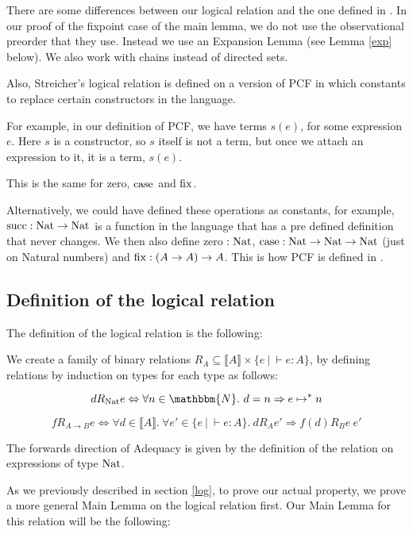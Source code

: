 There are some differences between our logical relation and the one defined in \citep{Streicher06}. In our proof of the fixpoint case of the main lemma, we do not use the observational preorder that they use. Instead we use an Expansion Lemma (see Lemma \ref{exp} below). We also work with chains instead of directed sets.

Also, Streicher's logical relation is defined on a version of PCF in which  constants to replace certain constructors in the language.

For example, in our definition of PCF, we have terms $s(e)$, for some expression $e$. Here $s$ is a constructor, so $s$ itself is not a term, but once we attach an expression to it, it is a term, $s(e)$.

This is the same for zero, $\operatorname{case}$ and $\operatorname{fix}$.

Alternatively, we could have defined these operations as constants, for example, $\operatorname{succ} : \operatorname{Nat} \to \operatorname{Nat}$ is a function in the language that has a pre defined definition that never changes. We then also define zero $: \operatorname{Nat}$, $\operatorname{case} : \operatorname{Nat} \to \operatorname{Nat} \to \operatorname{Nat}$ (just on Natural numbers) and $\operatorname{fix} : (A \to A) \to A$. This is how PCF is defined in \citep{Streicher06}.
 
\subsection{Definition of the logical relation}
The definition of the logical relation is the following:

\vspace{0.5cm}

\begin{defn}
We create a family of binary  relations $R_A \subseteq \llbracket A \rrbracket \times \{e \ | \ \vdash e : A \}$, by defining relations by induction on types for each type as follows:

\[ d  R_{\nat}  e \Leftrightarrow \forall n \in \mathbbm{N}. \ d = n \Rightarrow e \mapsto^* n\]

\[f  R_{A \to B}  e \Leftrightarrow \forall d \in \llbracket A \rrbracket. \ \forall e' \in \{ e \ | \ \vdash e : A\}. \ d R_A e' \Rightarrow f(d) R_B  e \ e'\]

\end{defn}

The forwards direction of Adequacy is given by the definition of the relation on expressions of type $\operatorname{Nat}$.

As we previously described in section \ref{log}, to prove our actual property, we prove a more general Main Lemma on the logical relation first. Our Main Lemma for this relation will be the following:

